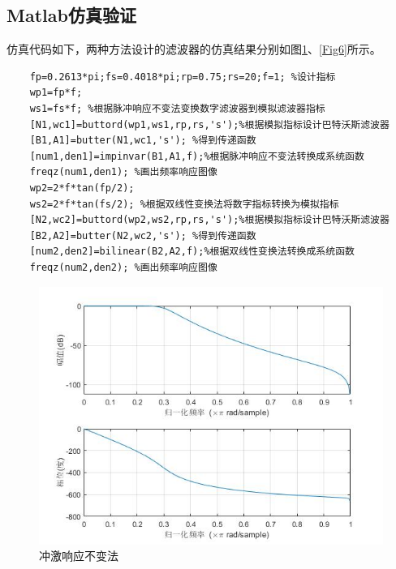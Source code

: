 \documentclass{seuer}
\begin{document}
\subsection{Matlab仿真验证}
仿真代码如下，两种方法设计的滤波器的仿真结果分别如图\ref{Fig5}、\ref{Fig6}所示。
\lstset{language=Matlab}
\begin{lstlisting}
	fp=0.2613*pi;fs=0.4018*pi;rp=0.75;rs=20;f=1; %设计指标
	wp1=fp*f;
	ws1=fs*f; %根据脉冲响应不变法变换数字滤波器到模拟滤波器指标
	[N1,wc1]=buttord(wp1,ws1,rp,rs,'s');%根据模拟指标设计巴特沃斯滤波器
	[B1,A1]=butter(N1,wc1,'s'); %得到传递函数
	[num1,den1]=impinvar(B1,A1,f);%根据脉冲响应不变法转换成系统函数
	freqz(num1,den1); %画出频率响应图像
	wp2=2*f*tan(fp/2);
	ws2=2*f*tan(fs/2); %根据双线性变换法将数字指标转换为模拟指标
	[N2,wc2]=buttord(wp2,ws2,rp,rs,'s');%根据模拟指标设计巴特沃斯滤波器
	[B2,A2]=butter(N2,wc2,'s'); %得到传递函数
	[num2,den2]=bilinear(B2,A2,f);%根据双线性变换法转换成系统函数
	freqz(num2,den2); %画出频率响应图像
\end{lstlisting}
\begin{figure}[H] %
	\centering %
	\includegraphics[width=1\textwidth]{"../DSPAssignment/冲激响应不变法.jpg"} %
	\caption{冲激响应不变法} %
	\label{Fig5} %
\end{figure}
\end{document}
